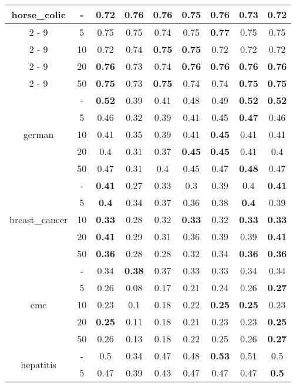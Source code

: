 \documentclass{article}%
\begin{document}
\begin{longtable}{c|c|ccccccc}
\hline%
\multirow{5}{*}{horse\_colic}&{-}&0.72&\textbf{0.76}&\textbf{0.76}&0.75&\textbf{0.76}&0.73&0.72\\%
\cline{2%
-%
9}%
&5&0.75&0.75&0.74&0.75&\textbf{0.77}&0.75&0.75\\%
\cline{2%
-%
9}%
&10&0.72&0.74&\textbf{0.75}&\textbf{0.75}&0.72&0.72&0.72\\%
\cline{2%
-%
9}%
&20&\textbf{0.76}&0.73&0.74&\textbf{0.76}&\textbf{0.76}&\textbf{0.76}&\textbf{0.76}\\%
\cline{2%
-%
9}%
&50&\textbf{0.75}&0.73&\textbf{0.75}&0.74&0.74&\textbf{0.75}&\textbf{0.75}\\%
\hline%
\multirow{5}{*}{german}&{-}&\textbf{0.52}&0.39&0.41&0.48&0.49&\textbf{0.52}&\textbf{0.52}\\%
\cline{2%
-%
9}%
&5&0.46&0.32&0.39&0.41&0.45&\textbf{0.47}&0.46\\%
\cline{2%
-%
9}%
&10&0.41&0.35&0.39&0.41&\textbf{0.45}&0.41&0.41\\%
\cline{2%
-%
9}%
&20&0.4&0.31&0.37&\textbf{0.45}&\textbf{0.45}&0.41&0.4\\%
\cline{2%
-%
9}%
&50&0.47&0.31&0.4&0.45&0.47&\textbf{0.48}&0.47\\%
\hline%
\multirow{5}{*}{breast\_cancer}&{-}&\textbf{0.41}&0.27&0.33&0.3&0.39&0.4&\textbf{0.41}\\%
\cline{2%
-%
9}%
&5&\textbf{0.4}&0.34&0.37&0.36&0.38&\textbf{0.4}&0.39\\%
\cline{2%
-%
9}%
&10&\textbf{0.33}&0.28&0.32&\textbf{0.33}&0.32&\textbf{0.33}&\textbf{0.33}\\%
\cline{2%
-%
9}%
&20&\textbf{0.41}&0.29&0.31&0.36&0.39&0.39&\textbf{0.41}\\%
\cline{2%
-%
9}%
&50&\textbf{0.36}&0.28&0.28&0.32&0.34&\textbf{0.36}&\textbf{0.36}\\%
\hline%
\multirow{5}{*}{cmc}&{-}&0.34&\textbf{0.38}&0.37&0.33&0.33&0.34&0.34\\%
\cline{2%
-%
9}%
&5&0.26&0.08&0.17&0.21&0.24&0.26&\textbf{0.27}\\%
\cline{2%
-%
9}%
&10&0.23&0.1&0.18&0.22&\textbf{0.25}&\textbf{0.25}&0.23\\%
\cline{2%
-%
9}%
&20&\textbf{0.25}&0.11&0.18&0.21&0.23&0.23&\textbf{0.25}\\%
\cline{2%
-%
9}%
&50&0.26&0.13&0.18&0.22&0.25&0.26&\textbf{0.27}\\%
\hline%
\multirow{5}{*}{hepatitis}&{-}&0.5&0.34&0.47&0.48&\textbf{0.53}&0.51&0.5\\%
\cline{2%
-%
9}%
&5&0.47&0.39&0.43&0.47&0.47&0.47&\textbf{0.5}\\%

\end{longtable}
\end{document}
